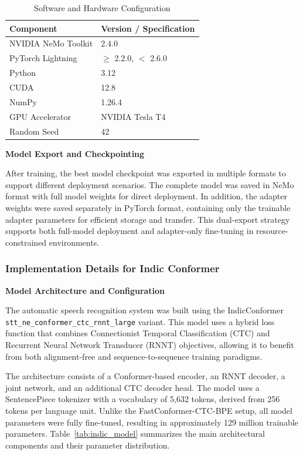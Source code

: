 \begin{table}[H]
\caption{Software and Hardware Configuration}
\label{tab:fastconformer_env}
\centering
\begin{tabular}{|l|l|}
\hline
\textbf{Component} & \textbf{Version / Specification} \\
\hline
NVIDIA NeMo Toolkit & 2.4.0 \\
PyTorch Lightning & $\geq$ 2.2.0, $<$ 2.6.0 \\
Python & 3.12 \\
CUDA & 12.8 \\
NumPy & 1.26.4 \\
GPU Accelerator & NVIDIA Tesla T4 \\
Random Seed & 42 \\
\hline
\end{tabular}
\end{table}

\textbf{Model Export and Checkpointing}

After training, the best model checkpoint was exported in multiple formats to support different deployment scenarios. The complete model was saved in NeMo format with full model weights for direct deployment. In addition, the adapter weights were saved separately in PyTorch format, containing only the trainable adapter parameters for efficient storage and transfer. This dual-export strategy supports both full-model deployment and adapter-only fine-tuning in resource-constrained environments.

\subsubsection{Implementation Details for Indic Conformer}

\textbf{Model Architecture and Configuration}

The automatic speech recognition system was built using the IndicConformer \texttt{stt\_ne\_conformer\_ctc\_rnnt\_large} variant. This model uses a hybrid loss function that combines Connectionist Temporal Classification (CTC) and Recurrent Neural Network Transducer (RNNT) objectives, allowing it to benefit from both alignment-free and sequence-to-sequence training paradigms.

The architecture consists of a Conformer-based encoder, an RNNT decoder, a joint network, and an additional CTC decoder head. The model uses a SentencePiece tokenizer with a vocabulary of 5,632 tokens, derived from 256 tokens per language unit. Unlike the FastConformer-CTC-BPE setup, all model parameters were fully fine-tuned, resulting in approximately 129 million trainable parameters. Table~\ref{tab:indic_model} summarizes the main architectural components and their parameter distribution.

